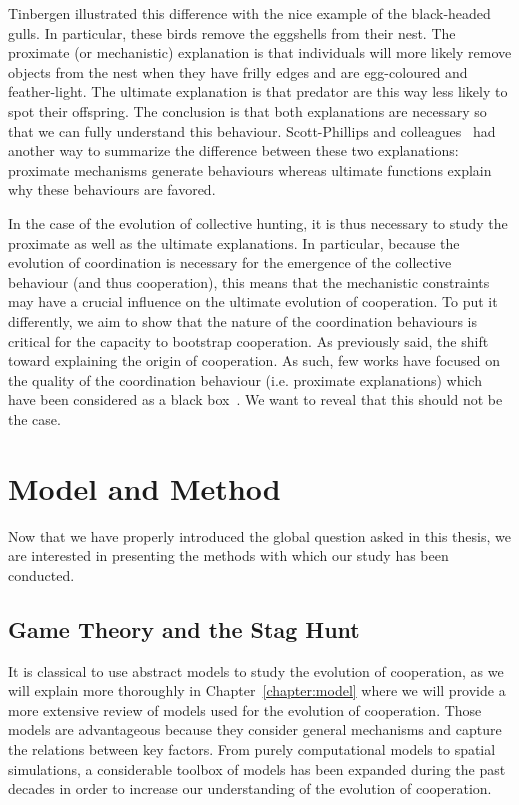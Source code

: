     Tinbergen illustrated this difference with the nice example of the black-headed gulls. In particular, these birds remove the eggshells from their nest. The proximate (or mechanistic) explanation is that individuals will more likely remove objects from the nest when they have frilly edges and are egg-coloured and feather-light. The ultimate explanation is that predator are this way less likely to spot their offspring. The conclusion is that both explanations are necessary so that we can fully understand this behaviour. Scott-Phillips and colleagues~\parencite{Scott-Phillips2011} had another way to summarize the difference between these two explanations: proximate mechanisms generate behaviours whereas ultimate functions explain why these behaviours are favored.

    In the case of the evolution of collective hunting, it is thus necessary to study the proximate as well as the ultimate explanations. In particular, because the evolution of coordination is necessary for the emergence of the collective behaviour (and thus cooperation), this means that the mechanistic constraints may have a crucial influence on the ultimate evolution of cooperation. To put it differently, we aim to show that the nature of the coordination behaviours is critical for the capacity to bootstrap cooperation. As previously said, the shift toward explaining the origin of cooperation. As such, few works have focused on the quality of the coordination behaviour (i.e. proximate explanations) which have been considered as a black box~\parencite{Calcott2007a}. We want to reveal that this should not be the case.




\section{Model and Method}

  Now that we have properly introduced the global question asked in this thesis, we are interested in presenting the methods with which our study has been conducted.
  
  \subsection{Game Theory and the Stag Hunt}

    It is classical to use abstract models to study the evolution of cooperation, as we will explain more thoroughly in Chapter~\ref{chapter:model} where we will provide a more extensive review of models used for the evolution of cooperation. Those models are advantageous because they consider general mechanisms and capture the relations between key factors. From purely computational models to spatial simulations, a considerable toolbox of models has been expanded during the past decades in order to increase our understanding of the evolution of cooperation.

